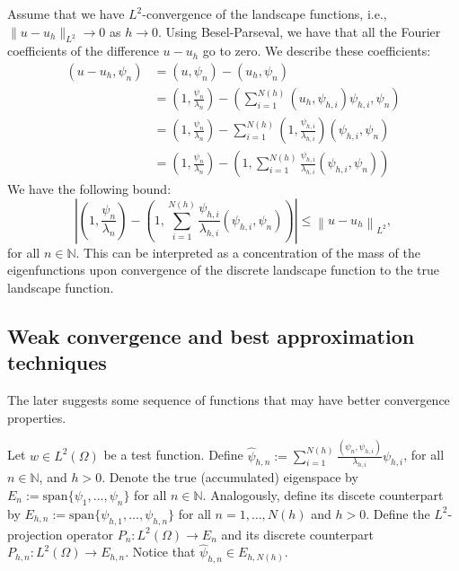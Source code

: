 \documentclass[12pt]{amsart}
\begin{document}
Assume that we have \(L^2\)-convergence of the landscape functions, i.e., \(\lVert u - u_h \rVert_{L^2} \to 0\) as \(h \to 0\).
Using Besel-Parseval, we have that all the Fourier coefficients of the difference \(u - u_h\) go to zero.
We describe these coefficients:
\begin{align*}
    \label{eq:fourier}
    (u - u_h, \psi_n) & = (u, \psi_n) - (u_h, \psi_n)\\
    & = \left(1, \frac{\psi_n}{\lambda_n}\right) -
    \left(\sum_{i=1}^{N(h)} (u_h, \psi_{h, i}) \psi_{h, i}, \psi_n\right) \\
    & = \left(1, \frac{\psi_n}{\lambda_n}\right) - \sum_{i=1}^{N(h)}  \left(1, \frac{\psi_{h, i}}{\lambda_{h, i}} \right) (\psi_{h, i}, \psi_n) \\
    & = \left(1, \frac{\psi_n}{\lambda_n}\right) - \left(1, \sum_{i=1}^{N(h)} \frac{\psi_{h, i}}{\lambda_{h, i}} (\psi_{h, i}, \psi_n)\right)
\end{align*}
We have the following bound:
\begin{equation}
    \label{eq:fourier_bound}
    \left\lvert
    \left(1, \frac{\psi_n}{\lambda_n}\right) - \left(1, \sum_{i=1}^{N(h)} \frac{\psi_{h, i}}{\lambda_{h, i}} (\psi_{h, i}, \psi_n)\right)
    \right\rvert
\leq \left\lVert u - u_h \right\rVert_{L^2},
\end{equation}
for all \(n \in \mathbb{N}\).
This can be interpreted as a concentration of the mass of the eigenfunctions upon convergence of the discrete landscape function to the true landscape function.

\subsection{Weak convergence and best approximation techniques}

The later suggests some sequence of functions that may have better convergence properties.

Let \(w \in L^2(\Omega)\) be a test function.
Define \(\hat \psi_{h, n} := \sum_{i=1}^{N(h)} \frac{(\psi_n, \psi_{h, i})}{\lambda_{h, i}} \psi_{h, i}\), for all \(n \in \mathbb{N}\), and \(h > 0\).
Denote the true (accumulated) eigenspace by \( E_n := \text{span}\{\psi_1, \ldots, \psi_n\}\) for all \(n \in \mathbb{N}\).
Analogously, define its discete counterpart by \(E_{h, n} := \text{span}\{\psi_{h, 1}, \ldots, \psi_{h, n}\}\) for all \(n = 1, \dots, N(h)\) and \(h > 0\).
Define the \(L^2\)-projection operator \(P_n: L^2(\Omega) \to E_n\) and its discrete counterpart \(P_{h, n}: L^2(\Omega) \to E_{h, n}\).
Notice that \(\hat \psi_{h, n} \in E_{h, N(h)}\).
\end{document}
